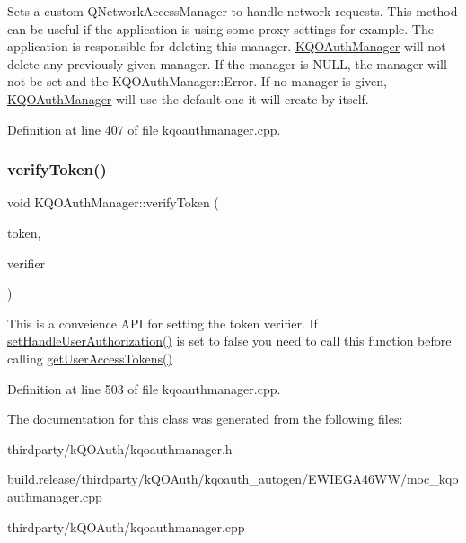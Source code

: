 Sets a custom Q\+Network\+Access\+Manager to handle network requests. This method can be useful if the application is using some proxy settings for example. The application is responsible for deleting this manager. \hyperlink{class_k_q_o_auth_manager}{K\+Q\+O\+Auth\+Manager} will not delete any previously given manager. If the manager is N\+U\+LL, the manager will not be set and the K\+Q\+O\+Auth\+Manager\+::\+Error. If no manager is given, \hyperlink{class_k_q_o_auth_manager}{K\+Q\+O\+Auth\+Manager} will use the default one it will create by itself. 

Definition at line 407 of file kqoauthmanager.\+cpp.

\mbox{\label{class_k_q_o_auth_manager_a9bcf83ccbd9fbbc352b7a228d80713ef}} 
\subsubsection{\texorpdfstring{verify\+Token()}{verifyToken()}}
{\footnotesize\ttfamily void K\+Q\+O\+Auth\+Manager\+::verify\+Token (\begin{DoxyParamCaption}\item[{const Q\+String \&}]{token,  }\item[{const Q\+String \&}]{verifier }\end{DoxyParamCaption})}

This is a conveience A\+PI for setting the token verifier. If \hyperlink{class_k_q_o_auth_manager_a55409df469317596b81ab50823eb6a97}{set\+Handle\+User\+Authorization()} is set to false you need to call this function before calling \hyperlink{class_k_q_o_auth_manager_a657d5a05c680ed6c53199e9de59f2e1c}{get\+User\+Access\+Tokens()} 

Definition at line 503 of file kqoauthmanager.\+cpp.



The documentation for this class was generated from the following files\+:\begin{DoxyCompactItemize}
\item 
thirdparty/k\+Q\+O\+Auth/kqoauthmanager.\+h\item 
build.\+release/thirdparty/k\+Q\+O\+Auth/kqoauth\+\_\+autogen/\+E\+W\+I\+E\+G\+A46\+W\+W/moc\+\_\+kqoauthmanager.\+cpp\item 
thirdparty/k\+Q\+O\+Auth/kqoauthmanager.\+cpp\end{DoxyCompactItemize}
